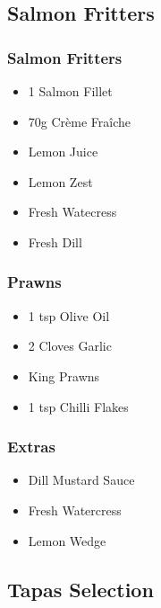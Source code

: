 \documentclass[11pt, english]{article}
\begin{document}
	\subsection{Salmon Fritters}

		\subsubsection*{Salmon Fritters}

	\begin{itemize}
        \setlength\itemsep{0cm}
                \item 1 Salmon Fillet
		\item 70g Cr\`{e}me Fra\^{i}che
		\item Lemon Juice
		\item Lemon Zest
		\item Fresh Watecress
		\item Fresh Dill
        \end{itemize}

		\subsubsection*{Prawns}

	\begin{itemize}
        \setlength\itemsep{0cm}
                \item 1 tsp Olive Oil
		\item 2 Cloves Garlic
		\item King Prawns
		\item 1 tsp Chilli Flakes
        \end{itemize}

		\subsubsection*{Extras}

	\begin{itemize}
        \setlength\itemsep{0cm}
                \item Dill Mustard Sauce
		\item Fresh Watercress
		\item Lemon Wedge
        \end{itemize}

\newpage

	\subsection{Tapas Selection}
\end{document}
